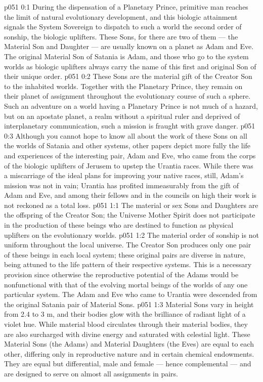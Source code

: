 \author{Secondary Lanonandek}
\vs p051 0:1 During the dispensation of a Planetary Prince, primitive man reaches the limit of natural evolutionary development, and this biologic attainment signals the System Sovereign to dispatch to such a world the second order of sonship, the biologic uplifters. These Sons, for there are two of them --- the Material Son and Daughter --- are usually known on a planet as Adam and Eve. The original Material Son of Satania is Adam, and those who go to the system worlds as biologic uplifters always carry the name of this first and original Son of their unique order.
\vs p051 0:2 These Sons are the material gift of the Creator Son to the inhabited worlds. Together with the Planetary Prince, they remain on their planet of assignment throughout the evolutionary course of such a sphere. Such an adventure on a world having a Planetary Prince is not much of a hazard, but on an apostate planet, a realm without a spiritual ruler and deprived of interplanetary communication, such a mission is fraught with grave danger.
\vs p051 0:3 Although you cannot hope to know all about the work of these Sons on all the worlds of Satania and other systems, other papers depict more fully the life and experiences of the interesting pair, Adam and Eve, who came from the corps of the biologic uplifters of Jerusem to upstep the Urantia races. While there was a miscarriage of the ideal plans for improving your native races, still, Adam’s mission was not in vain; Urantia has profited immeasurably from the gift of Adam and Eve, and among their fellows and in the councils on high their work is not reckoned as a total loss.
\vs p051 1:1 The material or sex Sons and Daughters are the offspring of the Creator Son; the Universe Mother Spirit does not participate in the production of these beings who are destined to function as physical uplifters on the evolutionary worlds.
\vs p051 1:2 The material order of sonship is not uniform throughout the local universe. The Creator Son produces only one pair of these beings in each local system; these original pairs are diverse in nature, being attuned to the life pattern of their respective systems. This is a necessary provision since otherwise the reproductive potential of the Adams would be nonfunctional with that of the evolving mortal beings of the worlds of any one particular system. The Adam and Eve who came to Urantia were descended from the original Satania pair of Material Sons.
\vs p051 1:3 \pc Material Sons vary in height from 2.4 to 3 m, and their bodies glow with the brilliance of radiant light of a violet hue. While material blood circulates through their material bodies, they are also surcharged with divine energy and saturated with celestial light. These Material Sons (the Adams) and Material Daughters (the Eves) are equal to each other, differing only in reproductive nature and in certain chemical endowments. They are equal but differential, male and female --- hence complemental --- and are designed to serve on almost all assignments in pairs.
